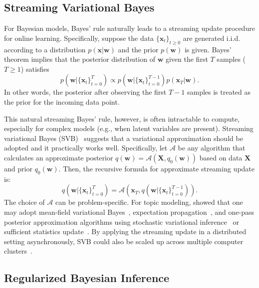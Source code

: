 \documentclass[twoside,11pt]{article}
\newcommand{\xv}{\bm{x}}
\newcommand{\Xv}{\bm{X}}
\newcommand{\algo}{\mathcal{A}}
\newcommand{\wv}{\bm{w}}
\begin{document}
\subsection{Streaming Variational Bayes}

For Bayesian models, Bayes' rule naturally leads to a streaming update procedure for online learning. Specifically, suppose the data $\{\xv_t\}_{t \geq 0}$ are generated i.i.d. according to a distribution $p(\xv | \wv)$ and the prior $p(\wv)$ is given. Bayes' theorem implies that the posterior distribution of $\wv$ given the first $T$ samples ($T \geq 1$) satisfies
\begin{equation}\label{eq:stream-Bayes-update}
p(\wv | \{\xv_t\}_{t=0}^T) \propto p(\wv | \{\xv_t\}_{t=0}^{T-1}) p(\xv_T | \wv).
\end{equation}
In other words, the posterior after observing the first $T-1$ samples is treated as the prior for the incoming data point.

This natural streaming Bayes' rule, however, is often intractable to compute, especially for complex models (e.g., when latent variables are present). Streaming variational Bayes (SVB)~\citep{broderick2013streaming} suggests that a variational approximation should be adopted and it practically works well. Specifically, let $\algo$ be any algorithm that calculates an approximate posterior $q(\wv) = \algo(\Xv, q_0(\wv))$ based on data $\Xv$ and prior $q_0(\wv)$. Then, the recursive formula for approximate streaming update is:
\begin{equation*}
q(\wv | \{\xv_t\}_{t=0}^T) = \algo\left( \xv_T, q(\wv | \{\xv_t\}_{t=0}^{T-1}) \right).
\end{equation*}
The choice of $\algo$ can be problem-specific. For topic modeling, \cite{broderick2013streaming} showed that one may adopt mean-field variational Bayes~\citep{wainwright2008graphical}, expectation propagation~\citep{minka2001expectation}, and one-pass posterior approximation algorithms using stochastic variational inference~\citep{hoffman2013stochastic} or sufficient statistics update~\citep{honkela2003line, luts2013real}. By applying the streaming update in a distributed setting asynchronously, SVB could also be scaled up across multiple computer clusters~\citep{broderick2013streaming}.



\subsection{Regularized Bayesian Inference}
\end{document}

